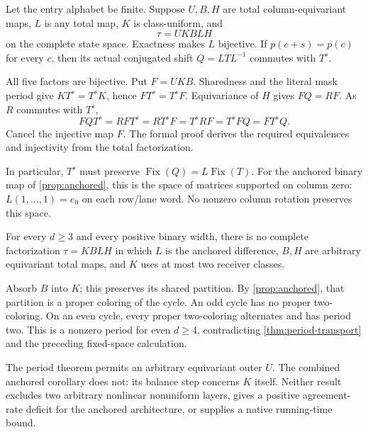 \begin{theorem}\label{thm:period-transport}
Let the entry alphabet be finite.  Suppose $U,B,H$ are total
column-equivariant maps, $L$ is any total map, $K$ is class-uniform,
and
\[
 \tau=UKBLH
\]
on the complete state space.  Exactness makes $L$ bijective.  If
$p(c+s)=p(c)$ for every $c$, then its actual conjugated shift
$Q=LTL^{-1}$ commutes with $T^s$.
\end{theorem}
\begin{outline}
All five factors are bijective.  Put $F=UKB$.  Sharedness and the
literal mask period give $KT^s=T^sK$, hence $FT^s=T^sF$.
Equivariance of $H$ gives $FQ=RF$.  As $R$ commutes with $T^s$,
\[
 FQT^s=RFT^s=RT^sF=T^sRF=T^sFQ=FT^sQ.
\]
Cancel the injective map $F$.  The formal proof derives the required
equivalences and injectivity from the total factorization.
\end{outline}

In particular, $T^s$ must preserve
$\operatorname{Fix}(Q)=L\operatorname{Fix}(T)$.
For the anchored binary map of \cref{prop:anchored}, this is the space
of matrices supported on column zero: $L(1,\ldots,1)=e_0$ on each
row/lane word.  No nonzero column rotation preserves this space.

\begin{corollary}\label{cor:anchored-all}
For every $d\ge3$ and every positive binary width, there is no complete
factorization $\tau=KBLH$ in which $L$ is the anchored difference,
$B,H$ are arbitrary equivariant total maps, and $K$ uses at most two
receiver classes.
\end{corollary}
\begin{outline}
Absorb $B$ into $K$; this preserves its shared partition.
By \cref{prop:anchored}, that partition is a proper coloring of the
cycle.  An odd cycle has no proper two-coloring.  On an even cycle,
every proper two-coloring alternates and has period two.  This is a
nonzero period for even $d\ge4$, contradicting
\cref{thm:period-transport} and the preceding fixed-space calculation.
\end{outline}

The period theorem permits an arbitrary equivariant outer $U$.  The
combined anchored corollary does not: its balance step concerns $K$
itself.  Neither result excludes two arbitrary nonlinear nonuniform
layers, gives a positive agreement-rate deficit for the anchored
architecture, or supplies a native running-time bound.
